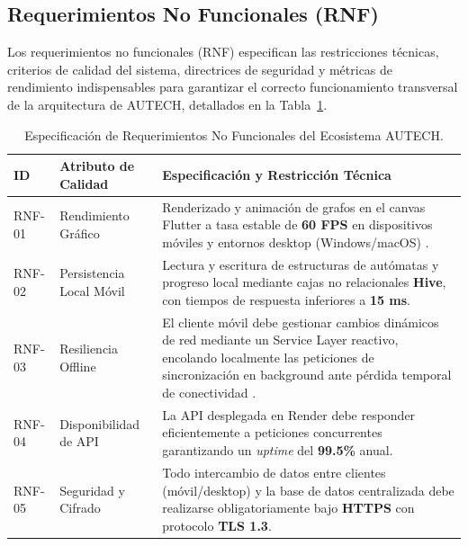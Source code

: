 \newpage
\subsection{Requerimientos No Funcionales (RNF)}
\label{subsec:req_no_funcionales}

Los requerimientos no funcionales (RNF) especifican las restricciones técnicas, criterios de calidad del sistema, directrices de seguridad y métricas de rendimiento indispensables para garantizar el correcto funcionamiento transversal de la arquitectura de AUTECH, detallados en la Tabla~\ref{tab:req_no_funcionales}.

\begin{table}[htbp]
\centering
\caption{Especificación de Requerimientos No Funcionales del Ecosistema AUTECH.}
\label{tab:req_no_funcionales}
\setlength{\tabcolsep}{4pt}
\renewcommand{\arraystretch}{1.1}
\scriptsize
\begin{tabularx}{\textwidth}{@{} l >{\raggedright\arraybackslash}p{2.6cm} >{\raggedright\arraybackslash}X @{}}
\toprule
\textbf{ID} & \textbf{Atributo de Calidad} & \textbf{Especificación y Restricción Técnica} \\
\midrule

RNF-01 & Rendimiento Gráfico &
Renderizado y animación de grafos en el canvas Flutter a tasa estable de \textbf{60 FPS} en dispositivos móviles y entornos desktop (Windows/macOS) \cite{flutter2024a}. \\

RNF-02 & Persistencia Local Móvil &
Lectura y escritura de estructuras de autómatas y progreso local mediante cajas no relacionales \textbf{Hive}, con tiempos de respuesta inferiores a \textbf{15 ms}. \\

RNF-03 & Resiliencia Offline &
El cliente móvil debe gestionar cambios dinámicos de red mediante un Service Layer reactivo, encolando localmente las peticiones de sincronización en background ante pérdida temporal de conectividad \cite{flutter2024c}. \\

RNF-04 & Disponibilidad de API &
La API desplegada en Render debe responder eficientemente a peticiones concurrentes garantizando un \textit{uptime} del \textbf{99.5\%} anual. \\

RNF-05 & Seguridad y Cifrado &
Todo intercambio de datos entre clientes (móvil/desktop) y la base de datos centralizada debe realizarse obligatoriamente bajo \textbf{HTTPS} con protocolo \textbf{TLS 1.3}. \\


\end{tabularx}
\end{table}
